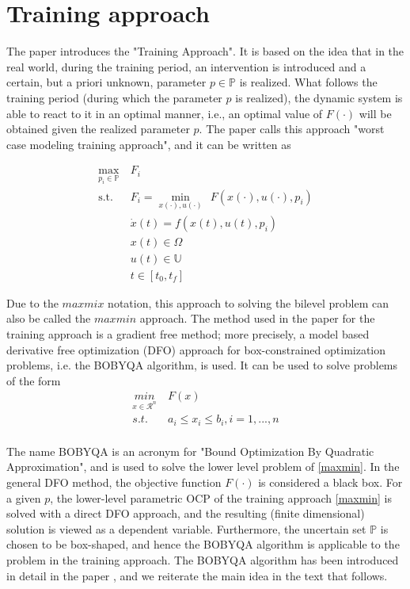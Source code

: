 \documentclass  [
  paper    = a4,
  BCOR     = 10mm,
  twoside,
  fontsize = 12pt,
  fleqn,
  toc      = bibnumbered,
  toc      = listofnumbered,
  numbers  = noendperiod,
  headings = normal,
  listof   = leveldown,
  version  = 3.03
]                                       {scrreprt}
\newcommand{\<}{\langle}
\renewcommand{\>}{\rangle}
\begin{document}
\section{Training approach}
The paper \cite{MatSch22} introduces the "Training Approach". It is based on the idea that in the real world, during the training period, an intervention is introduced and a certain, but a priori unknown, parameter $p \in \mathbb{P}$ is realized. What follows the training period (during which the parameter $p$ is realized), the dynamic system is able to react to it in an optimal manner, i.e., an optimal value of $ F(\cdot)$ will be obtained given the realized parameter $p$. The paper \cite{MatSch22} calls this approach "worst case modeling training approach", and it can be written as


\begin{equation}
	\begin{aligned}
		\underset{p_i \in \mathbb{P}}{\max} \ & F_i \\
		\text{s.t.}\ \ & F_i = \underset{x(\cdot), u(\cdot)}{\min} \ \ F(x(\cdot), u(\cdot), p_i) \\
		& \dot{x} (t) = f(x(t), u(t), p_i)\\
		& x(t) \in \Omega \\
		& u(t) \in \mathbb{U} \\
		& t \in [t_0, t_f]
	\end{aligned}
	\label{maxmin}
\end{equation}


Due to the $max mix$ notation, this approach to solving the bilevel problem can also be called the $max min$ approach. The method used in the paper \cite{MatSch22} for the training approach is a gradient free method; more precisely, a model based derivative free optimization (DFO) approach for box-constrained optimization problems, i.e. the BOBYQA algorithm, is used. It can be used to solve problems of the form
\begin{equation}
	\begin{aligned}
		\underset{x \in \mathcal{R}^n}{min} & \  F(x)  \\ 
		s.t.  & \ a_i \leq x_i \leq b_i, i = 1, ..., n \\
	\end{aligned}
	\label{DFO_bc}
\end{equation}

The name BOBYQA is an acronym for "Bound Optimization By Quadratic Approximation", and is used to solve the lower level problem of \ref{maxmin}. In the general DFO method, the objective function $F(\cdot)$ is considered a black box. For a given $p$, the lower-level parametric OCP of the training approach \ref{maxmin} is solved with a direct DFO approach, and the resulting (finite dimensional) solution is viewed as a dependent variable. Furthermore, the uncertain set $\mathbb{P}$ is chosen to be box-shaped, and hence the BOBYQA algorithm is applicable to the problem in the training approach. The BOBYQA algorithm has been introduced in detail in the paper \cite{MicPow09}, and we reiterate the main idea in the text that follows.
\end{document}
